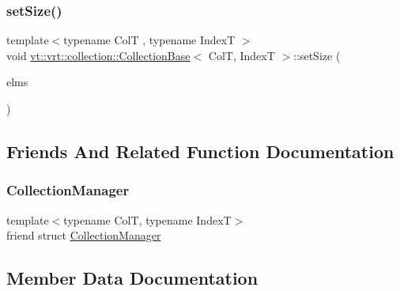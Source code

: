 \subsubsection{\texorpdfstring{set\+Size()}{setSize()}}
{\footnotesize\ttfamily template$<$typename ColT , typename IndexT $>$ \\
void \hyperlink{structvt_1_1vrt_1_1collection_1_1_collection_base}{vt\+::vrt\+::collection\+::\+Collection\+Base}$<$ ColT, IndexT $>$\+::set\+Size (\begin{DoxyParamCaption}\item[{\hyperlink{namespacevt_ac115668758184050beff7a9281a2c490}{Virtual\+Elm\+Count\+Type} const \&}]{elms }\end{DoxyParamCaption})}



\subsection{Friends And Related Function Documentation}
\mbox{\label{structvt_1_1vrt_1_1collection_1_1_collection_base_af9288b1963f434a90b307b5305a49510}} 
\subsubsection{\texorpdfstring{Collection\+Manager}{CollectionManager}}
{\footnotesize\ttfamily template$<$typename ColT, typename IndexT$>$ \\
friend struct \hyperlink{structvt_1_1vrt_1_1collection_1_1_collection_manager}{Collection\+Manager}\hspace{0.3cm}{\ttfamily [friend]}}



\subsection{Member Data Documentation}
\mbox{\label{structvt_1_1vrt_1_1collection_1_1_collection_base_a5f4feabd19ea4a986ee9da06bd7aeae0}} 

